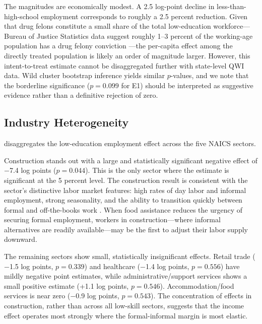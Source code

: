 \documentclass[12pt]{article}
\begin{document}
The magnitudes are economically modest. A 2.5 log-point decline in less-than-high-school employment corresponds to roughly a 2.5 percent reduction. Given that drug felons constitute a small share of the total low-education workforce---Bureau of Justice Statistics data suggest roughly 1--3 percent of the working-age population has a drug felony conviction \citep{carson2020prisoners}---the per-capita effect among the directly treated population is likely an order of magnitude larger. However, this intent-to-treat estimate cannot be disaggregated further with state-level QWI data. Wild cluster bootstrap inference yields similar $p$-values, and we note that the borderline significance ($p = 0.099$ for E1) should be interpreted as suggestive evidence rather than a definitive rejection of zero.

\subsection{Industry Heterogeneity}

 disaggregates the low-education employment effect across the five NAICS sectors.



Construction stands out with a large and statistically significant negative effect of $-$7.4 log points ($p = 0.044$). This is the only sector where the estimate is significant at the 5 percent level. The construction result is consistent with the sector's distinctive labor market features: high rates of day labor and informal employment, strong seasonality, and the ability to transition quickly between formal and off-the-books work \citep{apel2010criminal}. When food assistance reduces the urgency of securing formal employment, workers in construction---where informal alternatives are readily available---may be the first to adjust their labor supply downward.

The remaining sectors show small, statistically insignificant effects. Retail trade ($-$1.5 log points, $p = 0.339$) and healthcare ($-$1.4 log points, $p = 0.556$) have mildly negative point estimates, while administrative/support services shows a small positive estimate (+1.1 log points, $p = 0.546$). Accommodation/food services is near zero ($-$0.9 log points, $p = 0.543$). The concentration of effects in construction, rather than across all low-skill sectors, suggests that the income effect operates most strongly where the formal-informal margin is most elastic.
\end{document}
